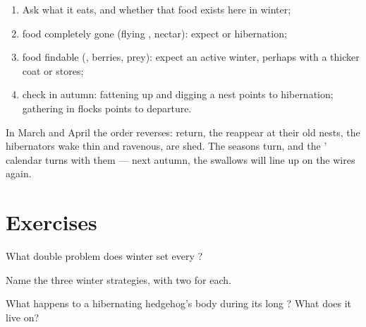 \begin{method}\label{met:g3:animals-through-seasons:guess}
\begin{enumerate}
  \item Ask what it eats, and whether that food exists here in
        winter;
  \item food completely gone (flying , nectar): expect
         or hibernation;
  \item food findable (, berries, prey): expect an active
        winter, perhaps with a thicker coat or stores;
  \item check in autumn: fattening up and digging a nest points
        to hibernation; gathering in flocks points to departure.
\end{enumerate}
\end{method}

\begin{example}\label{ex:g3:animals-through-seasons:spring}
In March and April the order reverses:  return, the
 reappear at their old nests, the hibernators wake
thin and ravenous,  are shed. The seasons turn, and
the ' calendar turns with them --- next autumn, the
swallows will line up on the wires again.
\end{example}

\section{Exercises}

\begin{exercise}[$\star$]\label{exo:g3:animals-through-seasons:1}
What double problem does winter set every ?
\end{exercise}

\begin{exercise}[$\star$]\label{exo:g3:animals-through-seasons:2}
Name the three winter strategies, with two  for each.
\end{exercise}

\begin{exercise}[$\star$]\label{exo:g3:animals-through-seasons:3}
What happens to a hibernating hedgehog's body during its long
? What does it live on?
\end{exercise}

